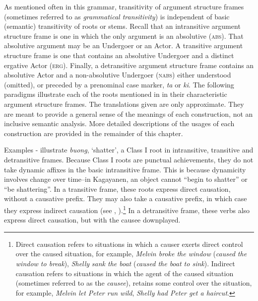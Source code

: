 As mentioned often in this grammar, transitivity of argument structure frames (sometimes referred to as \textit{grammatical transitivity}) is independent of basic (semantic) transitivity of roots or stems. Recall that an intransitive argument structure frame is one in which the only argument is an absolutive (\textsc{abs}). That absolutive argument may be an Undergoer or an Actor. A transitive argument structure frame is one that contains an absolutive Undergoer and a distinct ergative Actor (\textsc{erg}). Finally, a detransitive argument structure frame contains an absolutive Actor and a non-absolutive Undergoer (\textsc{nabs}) either understood (omitted), or preceded by a prenominal case marker, \textit{ta} or \textit{ki}. The following paradigms illustrate each of the roots mentioned in  in their characteristic argument structure frames. The translations given are only approximate. They are meant to provide a general sense of the meanings of each construction, not an inclusive semantic analysis. More detailed descriptions of the usages of each construction are provided in the remainder of this chapter.

Examples - illustrate \textit{buong}, ‘shatter’, a Class I root in intransitive, transitive and detransitive frames. Because Class I roots are punctual achievements, they do not take dynamic affixes in the basic intransitive frame. This is because dynamicity involves change over time--in Kagayanen, an object cannot “begin to shatter” or “be shattering”. In a transitive frame, these roots express direct causation, without a causative prefix. They may also take a causative prefix, in which case they express indirect causation (see , ).\footnote{Direct causation refers to situations in which a causer exerts direct control over the caused situation, for example, \textit{Melvin broke the window} (\textit{caused the window to break}), \textit{Shelly} \textit{sank the boat} (\textit{caused the boat to sink}). Indirect causation refers to situations in which the agent of the caused situation (sometimes referred to as the \textit{causee}), retains some control over the situation, for example, \textit{Melvin let Peter run wild}, \textit{Shelly had Peter get a haircut}.} In a detransitive frame, these verbs also express direct causation, but with the causee downplayed.

